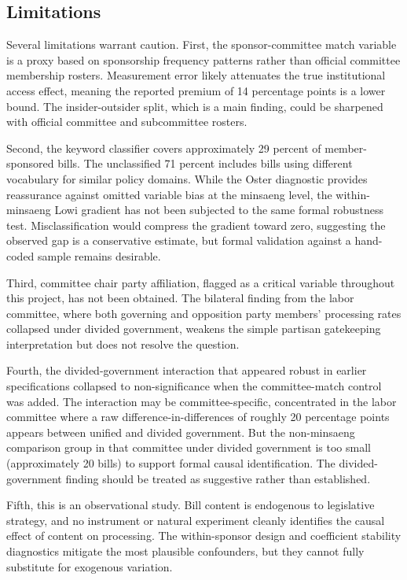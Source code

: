 \documentclass[11pt]{article}
\begin{document}
\subsection{Limitations}

Several limitations warrant caution. First, the sponsor-committee match variable is a proxy based on sponsorship frequency patterns rather than official committee membership rosters. Measurement error likely attenuates the true institutional access effect, meaning the reported premium of 14 percentage points is a lower bound. The insider-outsider split, which is a main finding, could be sharpened with official committee and subcommittee rosters.

Second, the keyword classifier covers approximately 29 percent of member-sponsored bills. The unclassified 71 percent includes bills using different vocabulary for similar policy domains. While the Oster diagnostic provides reassurance against omitted variable bias at the minsaeng level, the within-minsaeng Lowi gradient has not been subjected to the same formal robustness test. Misclassification would compress the gradient toward zero, suggesting the observed gap is a conservative estimate, but formal validation against a hand-coded sample remains desirable.

Third, committee chair party affiliation, flagged as a critical variable throughout this project, has not been obtained. The bilateral finding from the labor committee, where both governing and opposition party members' processing rates collapsed under divided government, weakens the simple partisan gatekeeping interpretation but does not resolve the question.

Fourth, the divided-government interaction that appeared robust in earlier specifications collapsed to non-significance when the committee-match control was added. The interaction may be committee-specific, concentrated in the labor committee where a raw difference-in-differences of roughly 20 percentage points appears between unified and divided government. But the non-minsaeng comparison group in that committee under divided government is too small (approximately 20 bills) to support formal causal identification. The divided-government finding should be treated as suggestive rather than established.

Fifth, this is an observational study. Bill content is endogenous to legislative strategy, and no instrument or natural experiment cleanly identifies the causal effect of content on processing. The within-sponsor design and coefficient stability diagnostics mitigate the most plausible confounders, but they cannot fully substitute for exogenous variation.
\end{document}

